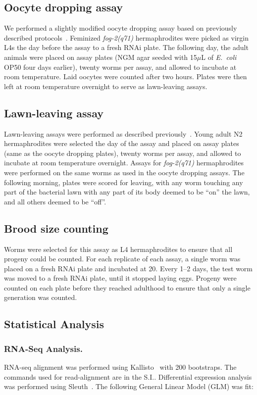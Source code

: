 \documentclass[9pt,twocolumn,twoside]{gsag3jnl}
\newcommand{\fog}{\emph{fog-2}}
\newcommand{\ecol}{\emph{E.~coli}}
\begin{document}
\subsection{Oocyte dropping assay}
\label{sb:oocyte_assay}
We performed a slightly modified oocyte dropping assay based on previously described protocols~\citep{White2012}. Feminized \fog{}\emph{(q71)} hermaphrodites were picked as virgin L4s the day before the assay to a fresh RNAi plate. The following day, the adult animals were placed on assay plates (NGM agar seeded with 15$\mu$L of \ecol{} OP50 four days earlier), twenty worms per assay, and allowed to incubate at room temperature. Laid oocytes were counted after two hours. Plates were then left at room temperature overnight to serve as lawn-leaving assays.

\subsection{Lawn-leaving assay}
\label{sb:lawn_leaving}
Lawn-leaving assays were performed as described previously~\citep{Lipton2004}. Young adult N2 hermaphrodites were selected the day of the assay and placed on assay plates (same as the oocyte dropping plates), twenty worms per assay, and allowed to incubate at room temperature overnight. Assays for \fog{}\emph{(q71)} hermaphrodites were performed on the same worms as used in the oocyte dropping assays. The following morning, plates were scored for leaving, with any worm touching any part of the bacterial lawn with any part of its body deemed to be “on” the lawn, and all others deemed to be “off”.

\subsection{Brood size counting}
\label{sb:brood_size}
Worms were selected for this assay as L4 hermaphrodites to ensure that all progeny could be counted. For each replicate of each assay, a single worm was placed on a fresh RNAi plate and incubated at 20\degree. Every 1--2 days, the test worm was moved to a fresh RNAi plate, until it stopped laying eggs. Progeny were counted on each plate before they reached adulthood to ensure that only a single generation was counted.

\subsection{Statistical Analysis}
\label{sb:statistics}
\subsubsection{RNA-Seq Analysis.}
RNA-seq alignment was performed using Kallisto~\citep{Bray2015} with 200 bootstraps. The commands used for read-alignment are in the S.I.. Differential expression analysis was performed using Sleuth~\citep{Pimentel2016}. The following General Linear Model (GLM) was fit:
\end{document}
